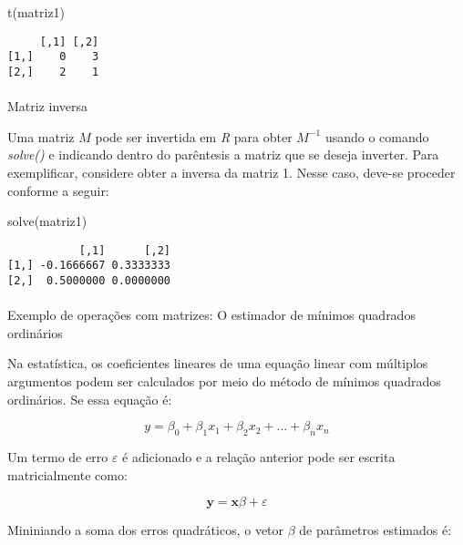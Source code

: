 \documentclass[
  letterpaper,
  DIV=11,
  numbers=noendperiod]{scrreprt}
\makeatletter
\let\oldparagraph\paragraph
\renewcommand{\paragraph}{
    \@ifstar
      \xxxParagraphStar
      \xxxParagraphNoStar
  }
\newcommand{\xxxParagraphStar}[1]{\oldparagraph*{#1}\mbox{}}
\newcommand{\xxxParagraphNoStar}[1]{\oldparagraph{#1}\mbox{}}
\newenvironment{Shaded}{\begin{snugshade}}{\end{snugshade}}
\newcommand{\FunctionTok}[1]{\textcolor[rgb]{0.28,0.35,0.67}{#1}}
\newcommand{\NormalTok}[1]{\textcolor[rgb]{0.00,0.23,0.31}{#1}}
\makeatother
\begin{document}
\begin{Shaded}
\begin{Highlighting}[]
\FunctionTok{t}\NormalTok{(matriz1)}
\end{Highlighting}
\end{Shaded}

\begin{verbatim}
     [,1] [,2]
[1,]    0    3
[2,]    2    1
\end{verbatim}

\paragraph{Matriz inversa}\label{matriz-inversa}

Uma matriz \(M\) pode ser invertida em \emph{R} para obter \(M^{-1}\)
usando o comando \emph{solve()} e indicando dentro do parêntesis a
matriz que se deseja inverter. Para exemplificar, considere obter a
inversa da matriz 1. Nesse caso, deve-se proceder conforme a seguir:

\begin{Shaded}
\begin{Highlighting}[]
\FunctionTok{solve}\NormalTok{(matriz1)}
\end{Highlighting}
\end{Shaded}

\begin{verbatim}
           [,1]      [,2]
[1,] -0.1666667 0.3333333
[2,]  0.5000000 0.0000000
\end{verbatim}

\paragraph{Exemplo de operações com matrizes: O estimador de mínimos
quadrados
ordinários}\label{exemplo-de-operauxe7uxf5es-com-matrizes-o-estimador-de-muxednimos-quadrados-ordinuxe1rios}

Na estatística, os coeficientes lineares de uma equação linear com
múltiplos argumentos podem ser calculados por meio do método de mínimos
quadrados ordinários. Se essa equação é:

\[ y = \beta_0 + \beta_1x_1 + \beta_2x_2 + \dots + \beta_n x_n \]

Um termo de erro \(\varepsilon\) é adicionado e a relação anterior pode
ser escrita matricialmente como:

\[ \textbf{y} = \textbf{x} \beta + \varepsilon \]

Mininiando a soma dos erros quadráticos, o vetor \(\beta\) de parâmetros
estimados é:
\end{document}
